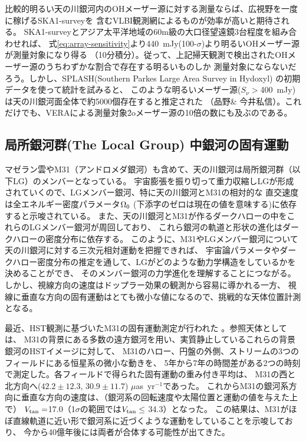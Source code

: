 比較的明るい天の川銀河内のOHメーザー源に対する測量ならば、広視野を一度に稼げるSKA1-surveyを
含むVLBI観測網によるものが効率が高いと期待される。
SKA1-surveyとアジア太平洋地域の60m級の大口径望遠鏡3台程度を組み合わせれば、
式\ref{eq:array-sensitivity}より440~mJy(100-$\sigma$)より明るいOHメーザー源が測量対象になり得る
（10分積分）。従って、上記掃天観測で検出されたOHメーザー源のうちわずかな割合で存在する明るいものしか
測量対象にならないだろう。しかし、SPLASH(Southern Parkes Large Area Survey in Hydoxyl)
\citep{2014MNRAS.439.1596D}の初期データを使って統計を試みると、
このような明るいメーザー源($S_{\nu}>$400~mJy)は天の川銀河面全体で約5000個存在すると推定された
（品野\& 今井私信）。これだけでも、VERAによる測量対象\h2oメーザー源の10倍の数にも及ぶのである。

\setcounter{subsection}{3}\subsection{局所銀河群(The Local Group) 中銀河の固有運動}\label{c7.s3.ss4}

マゼラン雲やM31（アンドロメダ銀河）も含めて、天の川銀河は局所銀河群（以下LG）のメンバーとなっている。
宇宙膨張を振り切って重力収縮しLGが形成されていくので、LGメンバー銀河、特に天の川銀河とM31の相対的な
直交速度は全エネルギー密度パラメータ$\Omega_{\rm 0}$ 
(下添字のゼロは現在の値を意味する)に依存すると示唆されている\citep{1990ApJ...362....1P,1994ApJ...429...43P}。
また、天の川銀河とM31が作るダークハローの中をこれらのLGメンバー銀河が周回しており、
これら銀河の軌道と形状の進化はダークハローの密度分布に依存する\citep{2001ApJ...559..754M}。
このように、M31やLGメンバー銀河について天の川銀河に対する三次元相対運動を把握できれば、
宇宙論パラメータやダークハロー密度分布の推定を通して、LGがどのような動力学構造をしているかを決めることができ、
そのメンバー銀河の力学進化を理解することにつながる。
しかし、視線方向の速度はドップラー効果の観測から容易に導かれる一方、
視線に垂直な方向の固有運動はとても微小な値になるので、挑戦的な天体位置計測となる。

最近、HST観測に基づいたM31の固有運動測定が行われた
\citep{2012ApJ...753....7S, 2012ApJ...753....9V, 2012ApJ...753....8V}。参照天体としては、
M31の背景にある多数の遠方銀河を用い、実質静止しているこれらの背景銀河のHSTイメージに対して、
M31のハロー、円盤の外側、ストリームの3つのフィールドにある恒星系の微小な動きを、
5年から7年の時間差がある2つの時刻で測定した。各フィールドで得られた固有運動の重み付き平均は、
M31の西と北方向へ($42.2 \pm 12.3$, $30.9 \pm 11.7$) $\mu$as~yr$^{-1}$であった。
これからM31の銀河系方向に垂直な方向の速度は、（銀河系の回転速度や太陽位置と運動の値を与えた上で）
$V_{\rm tan}=$17.0\kms（1$\sigma$の範囲では$V_{\rm tan} \le$ 34.3\kms）となった。
この結果は、M31がほぼ直線軌道に近い形で銀河系に近づくような運動をしていることを示唆しており、
今から40億年後には両者が合体する可能性が出てきた。

